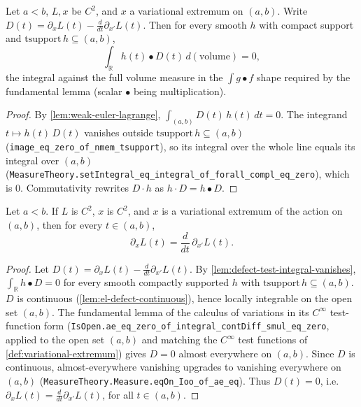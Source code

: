 \begin{lemma}
    \label{lem:defect-test-integral-vanishes}
    \leanok
    Let $a < b$, $L, x$ be $C^2$, and $x$ a variational extremum on $(a,b)$. Write
    $D(t) = \partial_x L(t) - \frac{d}{dt}\partial_{x'} L(t)$. Then for every
    smooth $h$ with compact support and $\mathrm{tsupport}\,h \subseteq (a,b)$,
    \[
      \int_{\mathbb{R}} h(t) \bullet D(t)\, d(\mathrm{volume}) = 0 ,
    \]
    the integral against the full volume measure in the $\int g \bullet f$ shape
    required by the fundamental lemma (scalar $\bullet$ being multiplication).
\end{lemma}
\begin{proof}
    By \cref{lem:weak-euler-lagrange}, $\int_{(a,b)} D(t)\,h(t)\,dt = 0$. The
    integrand $t \mapsto h(t)\,D(t)$ vanishes outside
    $\mathrm{tsupport}\,h \subseteq (a,b)$
    (\texttt{image\_eq\_zero\_of\_nmem\_tsupport}), so its integral over the whole
    line equals its integral over $(a,b)$
    (\texttt{MeasureTheory.setIntegral\_eq\_integral\_of\_forall\_compl\_eq\_zero}),
    which is $0$. Commutativity rewrites $D \cdot h$ as $h \cdot D = h \bullet D$.
\end{proof}

\begin{theorem}
    \label{thm:euler-lagrange}
    \leanok
    Let $a < b$. If $L$ is $C^2$, $x$ is $C^2$, and $x$ is a variational extremum
    of the action on $(a,b)$, then for every $t \in (a,b)$,
    \[
      \partial_x L(t) = \frac{d}{dt}\, \partial_{x'} L(t) .
    \]
\end{theorem}
\begin{proof}
    Let $D(t) = \partial_x L(t) - \frac{d}{dt}\partial_{x'} L(t)$. By
    \cref{lem:defect-test-integral-vanishes}, $\int_{\mathbb{R}} h \bullet D = 0$
    for every smooth compactly supported $h$ with
    $\mathrm{tsupport}\, h \subseteq (a,b)$. $D$ is continuous
    (\cref{lem:el-defect-continuous}), hence locally integrable on the open set
    $(a,b)$. The fundamental lemma of the calculus of variations in its
    $C^\infty$ test-function form
    (\texttt{IsOpen.ae\_eq\_zero\_of\_integral\_contDiff\_smul\_eq\_zero}, applied
    to the open set $(a,b)$ and matching the $C^\infty$ test functions of
    \cref{def:variational-extremum}) gives $D = 0$ almost everywhere on $(a,b)$.
    Since $D$ is continuous, almost-everywhere vanishing upgrades to vanishing
    everywhere on $(a,b)$ (\texttt{MeasureTheory.Measure.eqOn\_Ioo\_of\_ae\_eq}).
    Thus $D(t) = 0$, i.e. $\partial_x L(t) = \frac{d}{dt}\partial_{x'} L(t)$, for
    all $t \in (a,b)$.
\end{proof}


